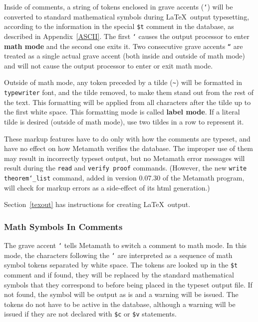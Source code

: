 Inside of comments, a string of tokens enclosed in grave
accents (\texttt{`}) will be converted
to standard mathematical symbols during \LaTeX\ output
typesetting, according to the information in the
special \texttt{\$t} comment in the database, as described in Appendix~\ref{ASCII}.
The first \texttt{`} causes the output processor to enter {\bf math
mode} and the second one exits it.  Two consecutive
grave accents \texttt{``} are treated as a single actual grave accent
(both inside and outside of math mode) and will not cause the output
processor to enter or exit math mode.

Outside of math mode, any token preceded by a tilde (\verb/~/) will be formatted in \texttt{typewriter}
font, and the tilde removed, to make them stand out from the rest of the
text.  This formatting will be applied from all characters after the
tilde up to the first white space.  This formatting
mode is called {\bf label mode}.  If a literal tilde
is desired (outside of math mode), use two tildes in a row to represent
it.

These markup features have to do only with how the comments are typeset,
and have no effect on how Metamath verifies the database.  The improper
use of them may result in incorrectly typeset output, but no Metamath
error messages will result during the \texttt{read} and \texttt{verify
proof} commands.  (However, the new \texttt{write
theorem\texttt{\char`\_}list} command, added in version 0.07.30 of the
Metamath program, will check for markup errors as a side-effect of its
{\sc html} generation.)

Section~\ref{texout} has instructions for creating \LaTeX\ output.

\subsubsection{Math Symbols In Comments}

The grave accent \texttt{`} tells
Metamath to switch a comment to math mode.  In this
mode, the characters following the \texttt{`} are interpreted as a
sequence of math symbol tokens separated by white space.  The tokens are looked up in the \texttt{\$t}
comment and if
found, they will be replaced by the standard mathematical symbols that
they correspond to before being placed in the typeset output file.  If
not found, the symbol will be output as is and a warning will be issued.
The tokens do not have to be active in the database, although a warning
will be issued if they are not declared with \texttt{\$c} or
\texttt{\$v} statements.

